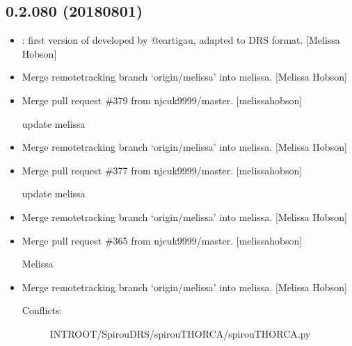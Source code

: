 \documentclass[a4paper,10pt,english]{report}
\begin{document}
\subsection{0.2.080 (2018\sphinxhyphen{}08\sphinxhyphen{}01)}
\label{\detokenize{misc/changelog:id402}}\begin{itemize}
\item {} 
: first version of  developed by
@eartigau, adapted to DRS format. {[}Melissa Hobson{]}

\item {} 
Merge remote\sphinxhyphen{}tracking branch ‘origin/melissa’ into melissa. {[}Melissa
Hobson{]}

\item {} 
Merge pull request \#379 from njcuk9999/master. {[}melissa\sphinxhyphen{}hobson{]}

update melissa

\item {} 
Merge remote\sphinxhyphen{}tracking branch ‘origin/melissa’ into melissa. {[}Melissa
Hobson{]}

\item {} 
Merge pull request \#377 from njcuk9999/master. {[}melissa\sphinxhyphen{}hobson{]}

update melissa

\item {} 
Merge remote\sphinxhyphen{}tracking branch ‘origin/melissa’ into melissa. {[}Melissa
Hobson{]}

\item {} 
Merge pull request \#365 from njcuk9999/master. {[}melissa\sphinxhyphen{}hobson{]}

Melissa

\item {} 
Merge remote\sphinxhyphen{}tracking branch ‘origin/melissa’ into melissa. {[}Melissa
Hobson{]}
\begin{description}
\item[{Conflicts:}] \leavevmode
INTROOT/SpirouDRS/spirouTHORCA/spirouTHORCA.py

\end{description}

\end{itemize}
\end{document}
